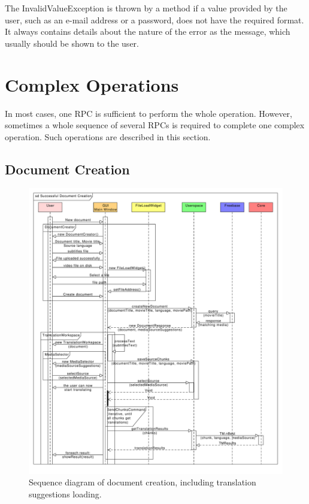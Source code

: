 The InvalidValueException is thrown by a method if a value provided by the user, such as an e-mail address or a password, does not have the required format. It always contains details about the nature of the error as the message, which usually should be shown to the user.

\section{Complex Operations}

In most cases, one RPC is sufficient to perform the whole operation. However, sometimes a whole sequence of several RPCs is required to complete one complex operation. Such operations are described in this section.

\subsection{Document Creation}

\begin{figure}[h]
\begin{center}
\includegraphics[scale=0.45]{figures/document_creation_sequence.pdf}
\end{center}
\caption{Sequence diagram of document creation, including translation suggestions loading.}\label{gui:sd:document_creation}
\end{figure}

